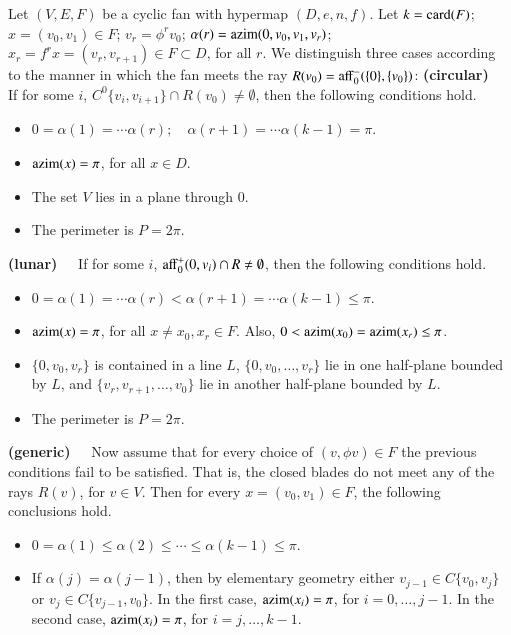 {{\begin{lemma}[monotonicity]  Let $(V,E,F)$ be a cyclic fan with hypermap $(D,e,n,f)$.  Let $k={\operatorname{card}}(F)$; $x=(v_0,v_1)\in F$;  $v_r = \phi^r v_0$; $\alpha(r) = {\operatorname{azim}}(0,v_0,v_1,v_r)$;  $x_r = f^r x = (v_r,v_{r+1})\in F\subset D$, for all $r$.  
We distinguish three cases according to the manner in which the fan meets the ray $R(v_0) = {\operatorname{aff}}_0^-(\{0\},\{v_0\})$:
{\bf (circular)~~} If for some $i$, $C^0\{v_i,v_{i+1}\}\cap R(v_0)\ne \emptyset$, then the following conditions hold.
\begin{itemize}
\item $0=\alpha(1)=\cdots \alpha(r);\quad \alpha(r+1)=\cdots\alpha(k-1)=\pi$.
\item ${\operatorname{azim}}(x)=\pi$, for all $x\in D$.
\item The set $V$ lies in a plane through $0$.
\item The perimeter is $P=2\pi$.
\end{itemize}
{\bf (lunar)~~} If for some $i$, ${\operatorname{aff}}_0^+(0,v_i) \cap R\ne\emptyset$, then the following conditions hold.
\begin{itemize}
\item $0=\alpha(1)=\cdots \alpha(r) < \alpha(r+1)=\cdots\alpha(k-1)\le\pi$.
\item ${\operatorname{azim}}(x)=\pi$, for all $x\ne x_0,x_r\in F$.  Also, $0<{\operatorname{azim}}(x_0)={\operatorname{azim}}(x_r)\le \pi$.
\item $\{0,v_0,v_r\}$ is contained in a line $L$, $\{0,v_0,\ldots,v_r\}$ lie in one half-plane bounded by $L$, and $\{v_r,v_{r+1},\ldots,v_0\}$ lie in another half-plane bounded by $L$.
\item The perimeter is $P=2\pi$.
\end{itemize}

{\bf (generic)~~} Now assume that for every choice of $(v,\phi v)\in F$ the previous conditions fail to be satisfied.  That is, the closed blades do not meet any of the rays $R(v)$, for $v\in V$.  Then for every $x=(v_0,v_1)\in F$, the following conclusions hold.
\begin{itemize}
\item $0=\alpha(1)\le \alpha(2)\le \cdots\le \alpha(k-1)\le\pi$.
\item If $\alpha(j)=\alpha(j-1)$, then by elementary geometry either $v_{j-1}\in C\{v_0,v_j\}$ or $v_j\in C\{v_{j-1},v_0\}$.  In the first case,
${\operatorname{azim}}(x_i)=\pi$, for $i=0,\ldots,j-1$.  In the second case,
${\operatorname{azim}}(x_i)=\pi$, for $i=j,\ldots,k-1$.
\end{itemize}
\end{lemma}

}}
